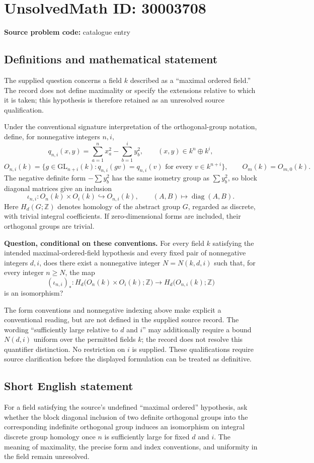 \documentclass[11pt]{article}
\newcommand{\Z}{\mathbb{Z}}
\begin{document}
\section*{UnsolvedMath ID: 30003708}
\textbf{Source problem code:} catalogue entry
\subsection{Definitions and mathematical statement}
The supplied question concerns a field \(k\) described as a ``maximal ordered field.'' The record does not define maximality or specify the extensions relative to which it is taken; this hypothesis is therefore retained as an unresolved source qualification.

Under the conventional signature interpretation of the orthogonal-group notation, define, for nonnegative integers \(n,i\),
\[
q_{n,i}(x,y)=\sum_{a=1}^{n}x_a^2-\sum_{b=1}^{i}y_b^2,
\qquad (x,y)\in k^n\oplus k^i,
\]
\[
O_{n,i}(k)=\{g\in\mathrm{GL}_{n+i}(k):q_{n,i}(gv)=q_{n,i}(v)\text{ for every }v\in k^{n+i}\},
\qquad O_m(k)=O_{m,0}(k).
\]
The negative definite form \(-\sum y_b^2\) has the same isometry group as \(\sum y_b^2\), so block diagonal matrices give an inclusion
\[
\iota_{n,i}:O_n(k)\times O_i(k)\hookrightarrow O_{n,i}(k),
\qquad (A,B)\longmapsto\operatorname{diag}(A,B).
\]
Here \(H_d(G;\Z)\) denotes homology of the abstract group \(G\), regarded as discrete, with trivial integral coefficients. If zero-dimensional forms are included, their orthogonal groups are trivial.

\textbf{Question, conditional on these conventions.} For every field \(k\) satisfying the intended maximal-ordered-field hypothesis and every fixed pair of nonnegative integers \(d,i\), does there exist a nonnegative integer \(N=N(k,d,i)\) such that, for every integer \(n\geq N\), the map
\[
(\iota_{n,i})_*:
H_d\bigl(O_n(k)\times O_i(k);\Z\bigr)
\longrightarrow H_d\bigl(O_{n,i}(k);\Z\bigr)
\]
is an isomorphism?

The form conventions and nonnegative indexing above make explicit a conventional reading, but are not defined in the supplied source record. The wording ``sufficiently large relative to \(d\) and \(i\)'' may additionally require a bound \(N(d,i)\) uniform over the permitted fields \(k\); the record does not resolve this quantifier distinction. No restriction on \(i\) is supplied. These qualifications require source clarification before the displayed formulation can be treated as definitive.
\subsection{Short English statement}
For a field satisfying the source's undefined ``maximal ordered'' hypothesis, ask whether the block diagonal inclusion of two definite orthogonal groups into the corresponding indefinite orthogonal group induces an isomorphism on integral discrete group homology once \(n\) is sufficiently large for fixed \(d\) and \(i\). The meaning of maximality, the precise form and index conventions, and uniformity in the field remain unresolved.
\end{document}
